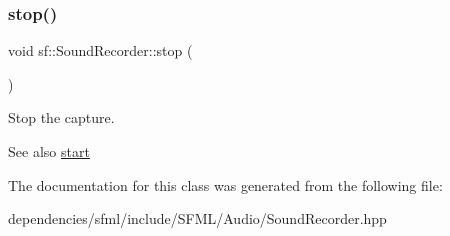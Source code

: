 \subsubsection{\texorpdfstring{stop()}{stop()}}
{\footnotesize\ttfamily void sf\+::\+Sound\+Recorder\+::stop (\begin{DoxyParamCaption}{ }\end{DoxyParamCaption})}



Stop the capture. 

\begin{DoxySeeAlso}{See also}
\hyperlink{classsf_1_1_sound_recorder_a715f0fd2f228c83d79aaedca562ae51f}{start} 
\end{DoxySeeAlso}


The documentation for this class was generated from the following file\+:\begin{DoxyCompactItemize}
\item 
dependencies/sfml/include/\+S\+F\+M\+L/\+Audio/Sound\+Recorder.\+hpp\end{DoxyCompactItemize}
